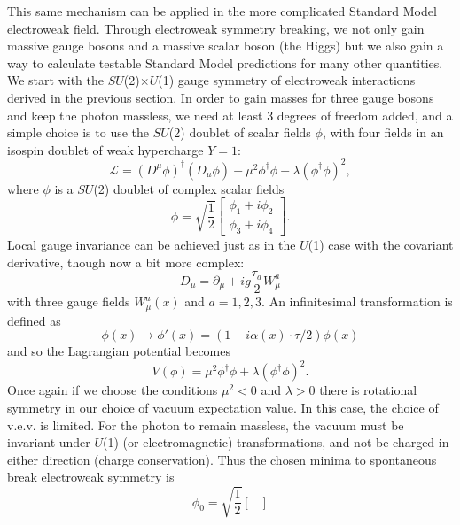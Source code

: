 This same mechanism can be applied in the more complicated Standard Model electroweak field. Through electroweak symmetry breaking, we not only gain massive gauge bosons and a massive scalar boson (the Higgs) but we also gain a way to calculate testable Standard Model predictions for many other quantities. We start with the $SU$(2)$\times$$U$(1) gauge symmetry of electroweak interactions derived in the previous section. In order to gain masses for three gauge bosons and keep the photon massless, we need at least 3 degrees of freedom added, and a simple choice is to use the $SU$(2) doublet of scalar fields $\phi$, with four fields in an isospin doublet of weak hypercharge $Y=1$: 
\begin{equation}
\mathcal{L} =(D^\mu \phi)^\dagger(D_\mu\phi)-\mu^2\phi^\dagger\phi-\lambda(\phi^\dagger\phi)^2,
\end{equation}
where $\phi$ is a $SU$(2) doublet of complex scalar fields
\begin{equation}
\phi = \sqrt{\frac{1}{2}}\begin{bmatrix}
	\phi_1+i\phi_2  \\
	\phi_3+i\phi_4
	\end{bmatrix} .
\end{equation}
Local gauge invariance can be achieved just as in the $U$(1) case with the covariant derivative, though now a bit more complex:
\begin{equation}
D_\mu = \partial_\mu + ig \frac{\tau_a}{2}W_\mu^a
\end{equation}
with three gauge fields $W_\mu^a(x)$ and $a=1,2,3$. An infinitesimal transformation is defined as 
\begin{equation}
\phi(x)\rightarrow \phi'(x) = (1+i\alpha(x)\cdot\tau/2)\phi(x)
\end{equation}
and so the Lagrangian potential becomes
\begin{equation}
V(\phi) = \mu^2\phi^\dagger\phi+\lambda(\phi^\dagger\phi)^2.
\end{equation}
Once again if we choose the conditions $\mu^2<0$ and $\lambda>0$ there is rotational symmetry in our choice of vacuum expectation value. In this case, the choice of v.e.v. is limited. For the photon to remain massless, the vacuum must be invariant under $U$(1) (or electromagnetic) transformations, and not be charged in either direction (charge conservation). Thus the chosen minima to spontaneous break electroweak symmetry is
\begin{equation}
\phi_0  = \sqrt{\frac{1}{2}}\begin{bmatrix}

\end{bmatrix}
\end{equation}$$
